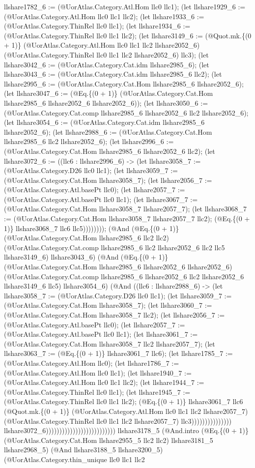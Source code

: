 \documentclass[11pt]{article}
\begin{document}
llshare1782\_6 := (@UorAtlas.Category.Atl.Hom llc0 llc1); (let llshare1929\_6 := (@UorAtlas.Category.Atl.Hom llc0 llc1 llc2); (let llshare1933\_6 := (@UorAtlas.Category.ThinRel llc0 llc1); (let llshare1934\_6 := (@UorAtlas.Category.ThinRel llc0 llc1 llc2); (let llshare3149\_6 := (@Quot.mk.\{(0 + 1)\} (@UorAtlas.Category.Atl.Hom llc0 llc1 llc2 llshare2052\_6) (@UorAtlas.Category.ThinRel llc0 llc1 llc2 llshare2052\_6) llc3); (let llshare3042\_6 := (@UorAtlas.Category.Cat.idm llshare2985\_6); (let llshare3043\_6 := (@UorAtlas.Category.Cat.idm llshare2985\_6 llc2); (let llshare2995\_6 := (@UorAtlas.Category.Cat.Hom llshare2985\_6 llshare2052\_6); (let llshare3047\_6 := (@Eq.\{(0 + 1)\} (@UorAtlas.Category.Cat.Hom llshare2985\_6 llshare2052\_6 llshare2052\_6)); (let llshare3050\_6 := (@UorAtlas.Category.Cat.comp llshare2985\_6 llshare2052\_6 llc2 llshare2052\_6); (let llshare3054\_6 := (@UorAtlas.Category.Cat.idm llshare2985\_6 llshare2052\_6); (let llshare2988\_6 := (@UorAtlas.Category.Cat.Hom llshare2985\_6 llc2 llshare2052\_6); (let llshare2996\_6 := (@UorAtlas.Category.Cat.Hom llshare2985\_6 llshare2052\_6 llc2); (let llshare3072\_6 := ((llc6 : llshare2996\_6) -> (let llshare3058\_7 := (@UorAtlas.Category.D26 llc0 llc1); (let llshare3059\_7 := (@UorAtlas.Category.Cat.Hom llshare3058\_7); (let llshare2056\_7 := (@UorAtlas.Category.Atl.basePt llc0); (let llshare2057\_7 := (@UorAtlas.Category.Atl.basePt llc0 llc1); (let llshare3067\_7 := (@UorAtlas.Category.Cat.Hom llshare3058\_7 llshare2057\_7); (let llshare3068\_7 := (@UorAtlas.Category.Cat.Hom llshare3058\_7 llshare2057\_7 llc2); (@Eq.\{(0 + 1)\} llshare3068\_7 llc6 llc5)))))))); (@And (@Eq.\{(0 + 1)\} (@UorAtlas.Category.Cat.Hom llshare2985\_6 llc2 llc2) (@UorAtlas.Category.Cat.comp llshare2985\_6 llc2 llshare2052\_6 llc2 llc5 llshare3149\_6) llshare3043\_6) (@And (@Eq.\{(0 + 1)\} (@UorAtlas.Category.Cat.Hom llshare2985\_6 llshare2052\_6 llshare2052\_6) (@UorAtlas.Category.Cat.comp llshare2985\_6 llshare2052\_6 llc2 llshare2052\_6 llshare3149\_6 llc5) llshare3054\_6) (@And ((llc6 : llshare2988\_6) -> (let llshare3058\_7 := (@UorAtlas.Category.D26 llc0 llc1); (let llshare3059\_7 := (@UorAtlas.Category.Cat.Hom llshare3058\_7); (let llshare3060\_7 := (@UorAtlas.Category.Cat.Hom llshare3058\_7 llc2); (let llshare2056\_7 := (@UorAtlas.Category.Atl.basePt llc0); (let llshare2057\_7 := (@UorAtlas.Category.Atl.basePt llc0 llc1); (let llshare3061\_7 := (@UorAtlas.Category.Cat.Hom llshare3058\_7 llc2 llshare2057\_7); (let llshare3063\_7 := (@Eq.\{(0 + 1)\} llshare3061\_7 llc6); (let llshare1785\_7 := (@UorAtlas.Category.Atl.Hom llc0); (let llshare1786\_7 := (@UorAtlas.Category.Atl.Hom llc0 llc1); (let llshare1940\_7 := (@UorAtlas.Category.Atl.Hom llc0 llc1 llc2); (let llshare1944\_7 := (@UorAtlas.Category.ThinRel llc0 llc1); (let llshare1945\_7 := (@UorAtlas.Category.ThinRel llc0 llc1 llc2); (@Eq.\{(0 + 1)\} llshare3061\_7 llc6 (@Quot.mk.\{(0 + 1)\} (@UorAtlas.Category.Atl.Hom llc0 llc1 llc2 llshare2057\_7) (@UorAtlas.Category.ThinRel llc0 llc1 llc2 llshare2057\_7) llc3))))))))))))))) llshare3072\_6)))))))))))))))))))))))))) llshare3178\_5 (@And.intro (@Eq.\{(0 + 1)\} (@UorAtlas.Category.Cat.Hom llshare2955\_5 llc2 llc2) llshare3181\_5 llshare2968\_5) (@And llshare3188\_5 llshare3200\_5) (@UorAtlas.Category.thin\_unique llc0 llc1 llc2 
\end{document}
